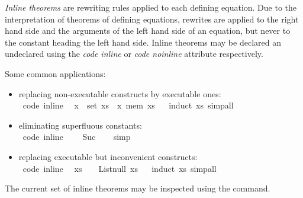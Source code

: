\begin{isabellebody}
\begin{isamarkuptext}
  \emph{Inline theorems} are rewriting rules applied to each
  defining equation.  Due to the interpretation of theorems
  of defining equations, rewrites are applied to the right
  hand side and the arguments of the left hand side of an
  equation, but never to the constant heading the left hand side.
  Inline theorems may be declared an undeclared using the
  \emph{code inline} or \emph{code noinline} attribute respectively.

  Some common applications:%
\end{isamarkuptext}%
\isamarkuptrue%
%
\begin{itemize}
     \item replacing non-executable constructs by executable ones: \\
\isamarkupfalse%
\ {\isacharbrackleft}code\ inline{\isacharbrackright}{\isacharcolon}\isanewline
\ \ {\isachardoublequoteopen}x\ {\isasymin}\ set\ xs\ {\isasymlongleftrightarrow}\ x\ mem\ xs{\isachardoublequoteclose}%
\isadelimproof
\ %
\endisadelimproof
%
\isatagproof
{}\isamarkupfalse%
\ {\isacharparenleft}induct\ xs{\isacharparenright}\ simp{\isacharunderscore}all%
\endisatagproof
{\isafoldproof}%
%
\isadelimproof
%
\endisadelimproof
%
\item eliminating superfluous constants: \\
\isamarkupfalse%
\ {\isacharbrackleft}code\ inline{\isacharbrackright}{\isacharcolon}\isanewline
\ \ {\isachardoublequoteopen}{}\ {\isacharequal}\ Suc\ {}{\isachardoublequoteclose}%
\isadelimproof
\ %
\endisadelimproof
%
\isatagproof
{}\isamarkupfalse%
\ simp%
\endisatagproof
{\isafoldproof}%
%
\isadelimproof
%
\endisadelimproof
%
\item replacing executable but inconvenient constructs: \\
\isamarkupfalse%
\ {\isacharbrackleft}code\ inline{\isacharbrackright}{\isacharcolon}\isanewline
\ \ {\isachardoublequoteopen}xs\ {\isacharequal}\ {\isacharbrackleft}{\isacharbrackright}\ {\isasymlongleftrightarrow}\ List{\isachardot}null\ xs{\isachardoublequoteclose}%
\isadelimproof
\ %
\endisadelimproof
%
\isatagproof
{}\isamarkupfalse%
\ {\isacharparenleft}induct\ xs{\isacharparenright}\ simp{\isacharunderscore}all%
\endisatagproof
{\isafoldproof}%
%
\isadelimproof
%
\endisadelimproof
%
\end{itemize}
%
\begin{isamarkuptext}%
The current set of inline theorems may be inspected using
  the \isa{{\isasymPRINTCODETHMS}} command.


\end{isamarkuptext}
\end{isabellebody}
